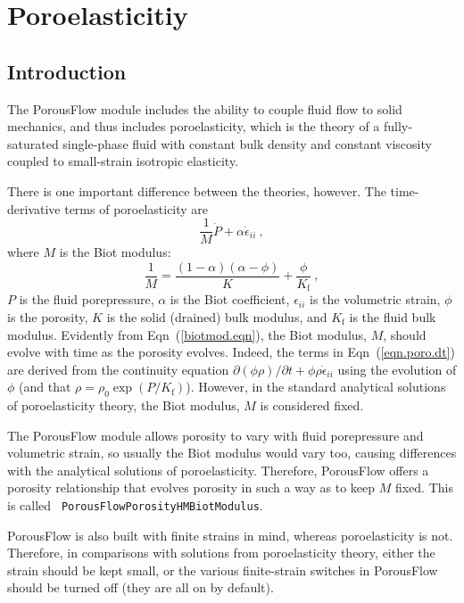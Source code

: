 \chapter{Poroelasticitiy}
\section{Introduction}

The PorousFlow module includes the ability to couple fluid flow to
solid mechanics, and thus includes poroelasticity, which is the theory
of a fully-saturated single-phase fluid with constant bulk density and
constant viscosity coupled to small-strain isotropic elasticity.

There is one important difference between the theories, however.  The
time-derivative terms of poroelasticity are
\begin{equation}
\frac{1}{M}\dot{P} + \alpha\dot{\epsilon}_{ii} \ ,
\label{eqn.poro.dt}
\end{equation}
where $M$ is the Biot modulus:
\begin{equation}
\frac{1}{M} = \frac{(1-\alpha)(\alpha - \phi)}{K} +
\frac{\phi}{K_{\mathrm{f}}} \ ,
\label{biotmod.eqn}
\end{equation}
$P$ is the fluid porepressure, $\alpha$ is the Biot coefficient,
$\epsilon_{ii}$ is the volumetric strain, $\phi$ is the porosity, $K$
is the solid (drained) bulk modulus, and $K_{\mathrm{f}}$ is the fluid
bulk modulus.  Evidently from Eqn~(\ref{biotmod.eqn}), the Biot
modulus, $M$, should evolve with time as the porosity evolves.
Indeed, the terms in Eqn~(\ref{eqn.poro.dt}) are derived from the
continuity equation $\partial (\phi\rho)/\partial t +
\phi\rho\dot{\epsilon}_{ii}$ using the evolution of $\phi$ (and that
$\rho = \rho_{0}\exp(P/K_{\mathrm{f}})$).  However, in the standard
analytical solutions of poroelasticity theory, the Biot modulus, $M$
is considered fixed.

The PorousFlow module allows porosity to vary with fluid porepressure
and volumetric strain, so usually the Biot modulus would vary too,
causing differences with the analytical solutions of poroelasticity.
Therefore, PorousFlow offers a porosity relationship that evolves
porosity in such a way as to keep $M$ fixed.  This is called {\tt
  PorousFlowPorosityHMBiotModulus}.

PorousFlow is also built with finite strains in mind, whereas
poroelasticity is not.  Therefore, in comparisons with solutions from
poroelasticity theory, either the strain should be kept small, or the
various finite-strain switches in PorousFlow should be turned off
(they are all on by default).

